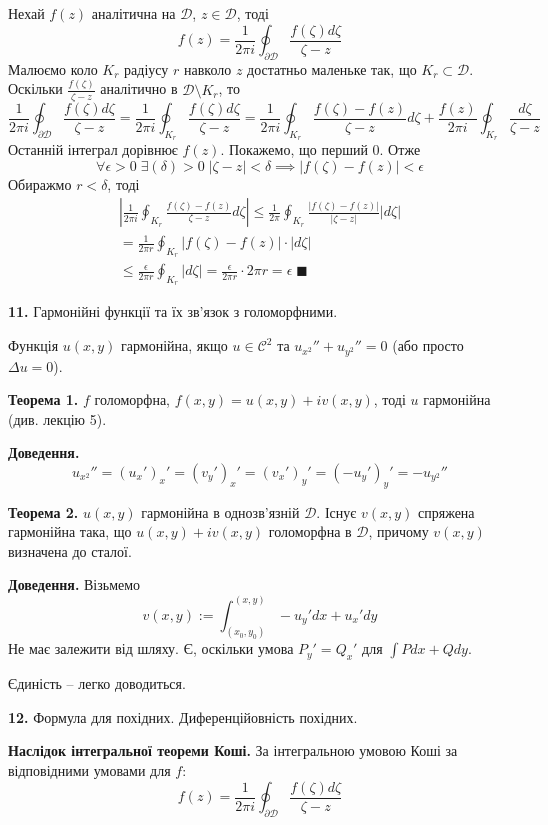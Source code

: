 \documentclass[14pt]{extarticle}
\begin{document}
Нехай $f(z)$ аналітична на $\mathcal{D}$, $z \in \mathcal{D}$, тоді
\[
f(z) =\frac{1}{2\pi i}\oint_{\partial\mathcal{D}}\frac{f(\zeta)d\zeta}{\zeta-z}
\]
Малюємо коло $K_r$ радіусу $r$ навколо $z$ достатньо маленьке так, що $K_r \subset \mathcal{D}$. Оскільки $\frac{f(\zeta)}{\zeta-z}$ аналітично в $\mathcal{D} \setminus K_r$, то
\[
\frac{1}{2\pi i}\oint_{\partial\mathcal{D}} \frac{f(\zeta)d\zeta}{\zeta-z} = \frac{1}{2\pi i}\oint_{K_r} \frac{f(\zeta)d\zeta}{\zeta-z} = \frac{1}{2\pi i}\oint_{K_r}\frac{f(\zeta)-f(z)}{\zeta - z}d\zeta + \frac{f(z)}{2\pi i}\oint_{K_r}\frac{d\zeta}{\zeta-z}
\]
Останній інтеграл дорівнює $f(z)$. Покажемо, що перший 0. Отже
\[
\forall \epsilon > 0 \; \exists(\delta) > 0 \; |\zeta-z| < \delta \implies |f(\zeta)-f(z)| < \epsilon
\]
Обиражмо $r<\delta$, тоді
\begin{gather*}
\left|\frac{1}{2\pi i}\oint_{K_r}\frac{f(\zeta)-f(z)}{\zeta-z}d\zeta\right| \leq \frac{1}{2\pi}\oint_{K_r} \frac{|f(\zeta)-f(z)|}{|\zeta-z|}|d\zeta| \\
= \frac{1}{2\pi r} \oint_{K_r}|f(\zeta)-f(z)|\cdot|d\zeta| \\
\leq \frac{\epsilon}{2\pi r}\oint_{K_r}|d\zeta| = \frac{\epsilon}{2\pi r} \cdot 2\pi r = \epsilon \; \blacksquare
\end{gather*}

\textbf{11.} Гармонійні функції та їх зв'язок з голоморфними.

Функція $u(x,y)$ гармонійна, якщо $u \in \mathcal{C}^2$ та $u_{x^2}''+u_{y^2}''=0$ (або просто $\Delta u=0$). 

\textbf{Теорема 1.} $f$ голоморфна, $f(x,y)=u(x,y)+iv(x,y)$, тоді $u$ гармонійна (див. лекцію 5). 

\textbf{Доведення.}
\[
u_{x^2}'' = (u_x')_x' = (v_y')_x'=(v_x')_y'= (-u_y')_y' = -u_{y^2}''
\]

\textbf{Теорема 2.} $u(x,y)$ гармонійна в однозв'язній $\mathcal{D}$. Існує $v(x,y)$ спряжена гармонійна така, що $u(x,y)+iv(x,y)$ голоморфна в $\mathcal{D}$, причому $v(x,y)$ визначена до сталої.

\textbf{Доведення.} Візьмемо
\[
v(x,y) := \int_{(x_0,y_0)}^{(x,y)} -u_y'dx + u_x'dy
\]
Не має залежити від шляху. Є, оскільки умова $P_y'=Q_x'$ для $\int Pdx+Qdy$. 

Єдиність -- легко доводиться.

\textbf{12.} Формула для похідних. Диференційовність похідних.

\textbf{Наслідок інтегральної теореми Коші.} За інтегральною умовою Коші за відповідними умовами для $f$:
\[
f(z) = \frac{1}{2\pi i}\oint_{\partial\mathcal{D}} \frac{f(\zeta)d\zeta}{\zeta-z}
\]
\end{document}
